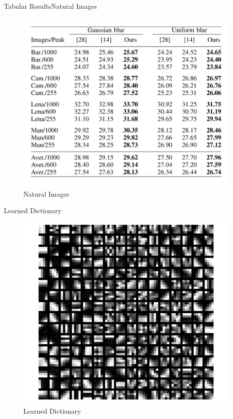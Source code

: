 \documentclass{beamer}
\begin{document}
\begin{frame}{Tabular Results}{Natural Images}
    \begin{figure}
        \centering
        \includegraphics[scale=0.45]{Table_result.png}
        \caption{Natural Images}
    \end{figure}
\end{frame}

\begin{frame}{Learned Dictionary}
\begin{figure}
    \centering
    \includegraphics[scale=0.5]{Dictionary_Medical}
    \caption{Learned Dictionary}
    \label{fig:my_label}
\end{figure}
    
\end{frame}
\end{document}
